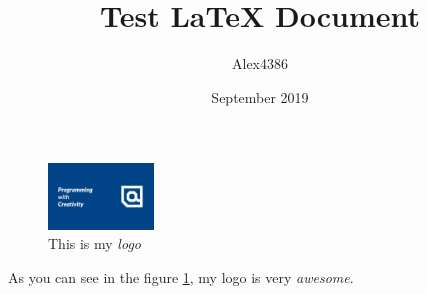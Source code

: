 \documentclass[12pt, letterpaper]{article}
\title{Test LaTeX Document}
\author{Alex4386}
\date{September 2019}
\begin{document}
\maketitle

\begin{figure}[h]
    \centering
    \includegraphics[width=0.25\textwidth]{background}
    \caption{This is my \emph{logo}}
    \label{myBG}
\end{figure}

As you can see in the figure \ref{myBG}, my logo is very \emph{awesome}.
\end{document}
